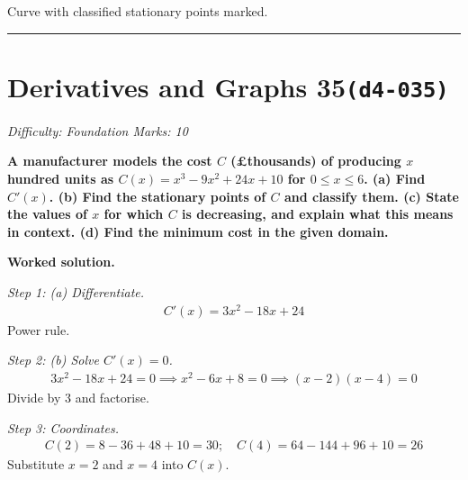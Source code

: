 \documentclass[11pt]{article}
\newcommand{\question}[1]{\par\medskip\noindent\textbf{#1}\par}
\begin{document}
\begin{center}
{
}
\end{center}
\small Curve with classified stationary points marked.\normalsize

\medskip\hrule

\section*{Derivatives and Graphs 35\quad\small\texttt{(d4-035)}}
\textit{Difficulty: Foundation \quad\textbar\quad Marks: 10}

\question{A manufacturer models the cost \( C \) (\pounds  thousands) of producing \( x \) hundred units as \( C(x) = x^3 - 9x^2 + 24x + 10 \) for \( 0 \leq x \leq 6 \). (a) Find \( C'(x) \). (b) Find the stationary points of \( C \) and classify them. (c) State the values of \( x \) for which \( C \) is decreasing, and explain what this means in context. (d) Find the minimum cost in the given domain.}

\textbf{Worked solution.}

\textit{Step 1: (a) Differentiate.}
\[\begin{gathered}
C'(x) = 3x^2 - 18x + 24
\end{gathered}\]
Power rule.

\textit{Step 2: (b) Solve \( C'(x) = 0 \).}
\[\begin{gathered}
3x^2 - 18x + 24 = 0 \implies x^2 - 6x + 8 = 0 \implies (x-2)(x-4) = 0
\end{gathered}\]
Divide by 3 and factorise.

\textit{Step 3: Coordinates.}
\[\begin{gathered}
C(2) = 8 - 36 + 48 + 10 = 30; \quad C(4) = 64 - 144 + 96 + 10 = 26
\end{gathered}\]
Substitute \( x = 2 \) and \( x = 4 \) into \( C(x) \).
\end{document}
